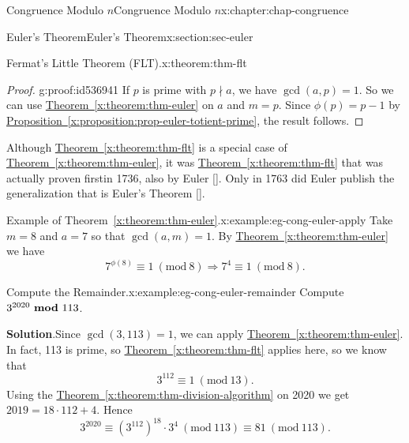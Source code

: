 \documentclass[oneside,10pt,]{book}
\newcommand{\blocktitlefont}{\relax}
\newcommand{\xreffont}{\relax}
\numberwithin{equation}{section}
\newcommand{\Mod}[1]{\ \left(\mathrm{mod}\ #1\right)}
\newcommand{\mmod}[1]{\ \mathrm{\bf mod}\ #1}
\begin{document}
\begin{chapterptx}{Congruence Modulo \(n\)}{}{Congruence Modulo \(n\)}{}{}{x:chapter:chap-congruence}
\begin{sectionptx}{Euler's Theorem}{}{Euler's Theorem}{}{}{x:section:sec-euler}
\begin{theorem}{Fermat's Little Theorem (FLT).}{}{x:theorem:thm-flt}
\begin{equation*}
\end{equation*}
%
\end{theorem}
\begin{proof}{}{g:proof:id536941}
If \(p\) is prime with \(p \nmid a\), we have \(\gcd(a,p) = 1\). So we can use \hyperref[x:theorem:thm-euler]{Theorem~{\xreffont\ref{x:theorem:thm-euler}}} on \(a\) and \(m = p\). Since \(\phi(p) = p-1\) by \hyperref[x:proposition:prop-euler-totient-prime]{Proposition~{\xreffont\ref{x:proposition:prop-euler-totient-prime}}}, the result follows.%
\end{proof}
Although \hyperref[x:theorem:thm-flt]{Theorem~{\xreffont\ref{x:theorem:thm-flt}}} is a special case of \hyperref[x:theorem:thm-euler]{Theorem~{\xreffont\ref{x:theorem:thm-euler}}}, it was \hyperref[x:theorem:thm-flt]{Theorem~{\xreffont\ref{x:theorem:thm-flt}}} that was actually proven first\textemdash{}in 1736, also by Euler \hyperlink{x:biblio:bib-euler-54}{[{\xreffont 1}]}. Only in 1763 did Euler publish the generalization that is Euler's Theorem \hyperlink{x:biblio:bib-euler-271}{[{\xreffont 2}]}.%
\begin{example}{Example of Theorem~{\xreffont\ref*{x:theorem:thm-euler}}.}{x:example:eg-cong-euler-apply}%
Take \(m = 8\) and \(a = 7\) so that \(\gcd(a,m) = 1\). By \hyperref[x:theorem:thm-euler]{Theorem~{\xreffont\ref{x:theorem:thm-euler}}} we have%
\begin{equation*}
7^{\phi(8)} \equiv 1 \Mod{8} \Rightarrow 7^4 \equiv 1 \Mod{8}\text{.}
\end{equation*}
%
\end{example}
\begin{example}{Compute the Remainder.}{x:example:eg-cong-euler-remainder}%
Compute \(3^{2020} \mmod 113\).%
\par\smallskip%
\noindent\textbf{\blocktitlefont Solution}.\hypertarget{g:solution:id541216}{}\quad{}Since \(\gcd(3,113) = 1\), we can apply \hyperref[x:theorem:thm-euler]{Theorem~{\xreffont\ref{x:theorem:thm-euler}}}. In fact, 113 is prime, so \hyperref[x:theorem:thm-flt]{Theorem~{\xreffont\ref{x:theorem:thm-flt}}} applies here, so we know that%
\begin{equation*}
3^{112} \equiv 1 \Mod{13}\text{.}
\end{equation*}
Using the \hyperref[x:theorem:thm-division-algorithm]{Theorem~{\xreffont\ref{x:theorem:thm-division-algorithm}}} on 2020 we get \(2019 = 18\cdot 112 + 4\). Hence%
\begin{equation*}
3^{2020} \equiv (3^{112})^{18} \cdot 3^4 \Mod{113} \equiv 81 \Mod{113}\text{.}

\end{equation*}
\end{example}
\end{sectionptx}
\end{chapterptx}
\end{document}

